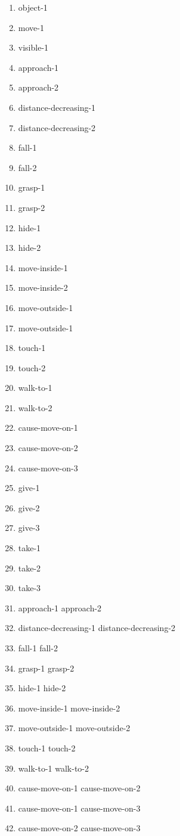 \begin{multicols}{2}
\begin{enumerate}
\item object-1
\item move-1
\item visible-1
\item approach-1
\item approach-2
\item distance-decreasing-1
\item distance-decreasing-2
\item fall-1
\item fall-2
\item grasp-1
\item grasp-2
\item hide-1
\item hide-2
\item move-inside-1
\item move-inside-2
\item move-outside-1
\item move-outside-1
\item touch-1
\item touch-2
\item walk-to-1
\item walk-to-2
\item cause-move-on-1
\item cause-move-on-2
\item cause-move-on-3
\item give-1
\item give-2
\item give-3
\item take-1
\item take-2
\item take-3
\item approach-1 approach-2
\item distance-decreasing-1 distance-decreasing-2
\item fall-1 fall-2
\item grasp-1 grasp-2
\item hide-1 hide-2
\item move-inside-1 move-inside-2
\item move-outside-1 move-outside-2
\item touch-1 touch-2
\item walk-to-1 walk-to-2
\item cause-move-on-1 cause-move-on-2
\item cause-move-on-1 cause-move-on-3
\item cause-move-on-2 cause-move-on-3

\end{enumerate}
\end{multicols}
